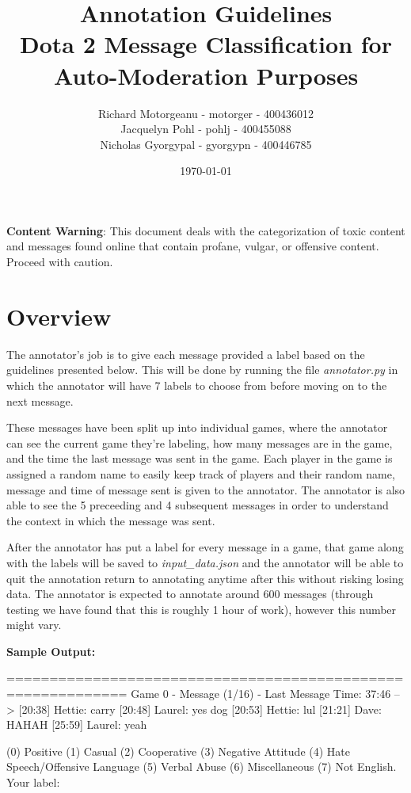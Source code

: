\documentclass[11pt, letterpaper, notitlepage]{article}
\title{Annotation Guidelines \\ Dota 2 Message Classification for Auto-Moderation Purposes}
\author{Richard Motorgeanu - motorger - 400436012\\ Jacquelyn Pohl - pohlj - 400455088\\ Nicholas Gyorgypal - gyorgypn - 400446785}
\date{\today}
\begin{document}
\maketitle


\vspace{6em}

\large
\textbf{Content Warning}: This document deals with the categorization of toxic content and messages found online that contain profane, vulgar, or offensive content. Proceed with caution.

\vspace{2em}

\newpage

\section[1]{Overview}

The annotator's job is to give each message provided a label based on the guidelines presented below.
This will be done by running the file \textit{annotator.py} in which the annotator will have 7 labels to choose from before moving on to the next message.

These messages have been split up into individual games, where the annotator can see the current game they're labeling, how many messages are in the game, and the time the last message was sent in the game.
Each player in the game is assigned a random name to easily keep track of players and their random name, message and time of message sent is given to the annotator.
The annotator is also able to see the 5 preceeding and 4 subsequent messages in order to understand the context in which the message was sent.

After the annotator has put a label for every message in a game, that game along with the labels will be saved to \textit{input\_data.json} and the annotator will be able to quit the annotation return to annotating anytime after this without risking losing data.
The annotator is expected to annotate around 600 messages (through testing we have found that this is roughly 1 hour of work), however this number might vary.

\vspace{2em}

\textbf{Sample Output:}
\begin{python}
============================================================
Game 0 - Message (1/16) - Last Message Time: 37:46
--> [20:38] Hettie: carry
    [20:48] Laurel: yes dog
    [20:53] Hettie: lul
    [21:21] Dave: HAHAH
    [25:59] Laurel: yeah 

(0) Positive (1) Casual (2) Cooperative (3) Negative Attitude (4) Hate Speech/Offensive Language (5) Verbal Abuse (6) Miscellaneous (7) Not English.
Your label: 
\end{python}
\end{document}
